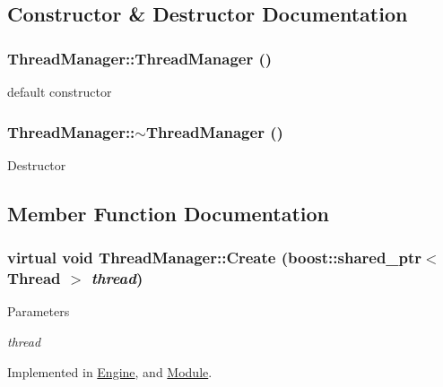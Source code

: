 \subsection{Constructor \& Destructor Documentation}
\hypertarget{classThreadManager_a613b13ebf45502e4d86c2f9317ec5871}{
\subsubsection[{ThreadManager}]{\setlength{\rightskip}{0pt plus 5cm}ThreadManager::ThreadManager ()}}
\label{de/d57/classThreadManager_a613b13ebf45502e4d86c2f9317ec5871}
default constructor \hypertarget{classThreadManager_a18eb12d3d752075318c3672c8efffd5b}{
\subsubsection[{$\sim$ThreadManager}]{\setlength{\rightskip}{0pt plus 5cm}ThreadManager::$\sim$ThreadManager ()}}
\label{de/d57/classThreadManager_a18eb12d3d752075318c3672c8efffd5b}
Destructor 

\subsection{Member Function Documentation}
\hypertarget{classThreadManager_afad6766592d98c6c0a2129f45e6a346e}{
\subsubsection[{Create}]{\setlength{\rightskip}{0pt plus 5cm}virtual void ThreadManager::Create (boost::shared\_\-ptr$<$ Thread $>$ {\em thread})}}
\label{de/d57/classThreadManager_afad6766592d98c6c0a2129f45e6a346e}

\begin{DoxyParams}{Parameters}
\item[{\em thread}]\end{DoxyParams}


Implemented in \hyperlink{classEngine_a5de6694a069170d2205599331e6e8691}{Engine}, and \hyperlink{classModule_a9984bf9d8b1ea6e280c8c47cdb56e906}{Module}.

